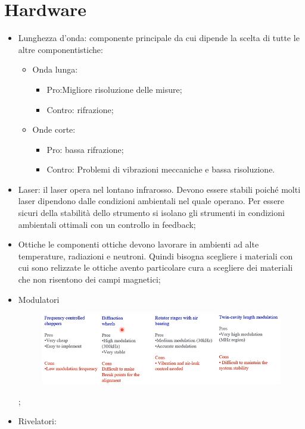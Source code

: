 \documentclass{article}
\begin{document}
\section{Hardware}
\begin{itemize}
	\item Lunghezza d'onda: componente principale da cui dipende la scelta di tutte le altre componentistiche:\begin{itemize}
		      \item Onda lunga:\begin{itemize}
			            \item Pro:Migliore risoluzione delle misure;
			            \item Contro: rifrazione;
		            \end{itemize}
		      \item Onde corte:\begin{itemize}
			            \item Pro: bassa rifrazione;
			            \item Contro: Problemi di vibrazioni meccaniche e bassa risoluzione.
		            \end{itemize}
	      \end{itemize}
	\item Laser: il laser opera nel lontano infrarosso. Devono essere stabili poiché molti laser dipendono dalle condizioni ambientali nel quale operano. Per essere sicuri della stabilità dello strumento si isolano gli strumenti in condizioni ambientali ottimali con un controllo in feedback;
	\item Ottiche le componenti ottiche devono lavorare in ambienti ad alte temperature, radiazioni e neutroni. Quindi bisogna scegliere i materiali con cui sono relizzate le ottiche avento particolare cura a scegliere dei materiali che non risentono dei campi magnetici;
	\item Modulatori\begin{figure}
		      \includegraphics[scale=0.4]{2022-05-29-16-41-03.png}%
	      \end{figure};
	\item Rivelatori:\begin{figure}

\end{figure}
\end{itemize}
\end{document}
